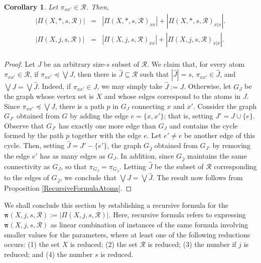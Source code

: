 \documentclass[12pt]{extarticle}
\newtheorem{Corollary}{Corollary}
\begin{document}
	\begin{Corollary}\label{CorollaryProposition4.4} Let $\pi_{xx'}\in \mathcal{R}$. Then,
		\begin{eqnarray}
		|\Pi(X, \ast, s, \mathcal{R})| &= &|\Pi(X, \ast, s, \mathcal{R})_{xx}|+|\Pi(X,\ast, s, \mathcal{R})_{x|x}|.\\
		|\Pi(X, j, s,\mathcal{R})|& = & |\Pi(X, j, s,\mathcal{R})_{xx}|+|\Pi(X, j, s,\mathcal{R})_{x|x}|.\\
		\nonumber
		\end{eqnarray}
	\end{Corollary}
	
	\begin{proof}
		Let $J$ be an arbitrary size-$s$ subset of $\mathcal{R}$. We claim that, for every atom $\pi_{xx'}\in \mathcal{R}$, if $\pi_{xx'}\preceq\bigvee J$, then there is $\hat{J}\subseteq \mathcal{R}$ such that $|\hat{J}|=s$, $\pi_{xx'}\in \hat{J}$, and $\bigvee J=\bigvee\hat{J}$. Indeed, if $\pi_{xx'}\in J$, we may simply take  $\hat{J}:=J$. Otherwise, let $G_J$ be the graph whose vertex set is $X$ and whose edges correspond to the atoms in $J$. Since $\pi_{xx'}\preceq\bigvee J$, there is a path $p$ in $G_J$ connecting $x$ and $x'$. Consider the graph $G_{J'}$ obtained from $G$ by adding the edge $e=\{x,x'\}$; that is, setting $J'=J\cup\{e\}$.  Observe that $G_{J'}$ has exactly one more edge than $G_J$ and contains the cycle formed by the path $p$ together with the edge $e$. Let $e'\neq e$ be another edge of this cycle. Then, setting $\hat{J}=J'-\{e'\}$, the graph $G_{\hat{J}}$ obtained from $G_{J'}$ by removing the edge $e'$ has as many edges as $G_J$. In addition, since $G_{\hat{J}}$ maintains the same connectivity as $G_J$,  so that $\pi_{G_J}=\pi_{G_{\hat{J}}}$. Letting $\hat{J}$ be the subset of $\mathcal{R}$ corresponding to the edges of $G_{\hat{J}}$, we conclude that $\bigvee J=\bigvee\hat{J}$. The result now follows from Proposition \ref{RecursiveFormulaAtoms}.
	\end{proof}
	
	We shall conclude this section by establishing a recursive formula for the  $\bm{\pi}(X,j,s,\mathcal{R}):=|\Pi(X,j,s,\mathcal{R})|$. Here, recursive formula refers to expressing $\bm{\pi}(X,j,s,\mathcal{R})$  as linear combination of instances of the same formula involving smaller values for the parameters, where at least one of the following reductions occurs: (1) the set $X$ is reduced; (2) the set $\mathcal{R}$ is reduced; (3) the number if $j$ is reduced; and (4) the number $s$ is reduced. 
	
\end{document}
